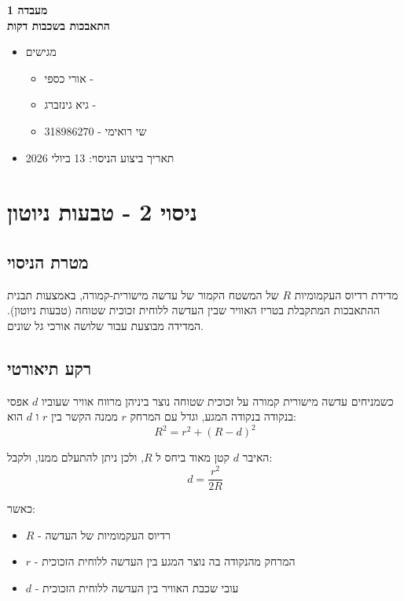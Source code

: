 \documentclass[14pt]{extarticle}
\begin{document}
\begin{center}
    {\LARGE \textbf{מעבדה 1}}\\
    {\textbf{התאבכות בשכבות דקות}}
\end{center}

\begin{itemize}
    \item מגישים
    \begin{itemize}
        \item אורי כספי - 
        \item גיא גינזברג - 
        \item שי רואימי - 318986270
    \end{itemize}
    \item תאריך ביצוע הניסוי: 13 ביולי 2026
\end{itemize}
\newpage
\section*{ניסוי 2 - טבעות ניוטון}

\subsection*{מטרת הניסוי}

מדידת רדיוס העקמומיות $R$ של המשטח הקמור של עדשה מישורית-קמורה,
באמצעות תבנית ההתאבכות המתקבלת בטריז האוויר שבין העדשה ללוחית זכוכית שטוחה (טבעות ניוטון). המדידה מבוצעת עבור שלושה אורכי גל שונים.

\subsection*{רקע תיאורטי}

כשמניחים עדשה מישורית קמורה על זכוכית שטוחה נוצר ביניהן מרווח אוויר שעוביו
$d$
אפסי בנקודה בנקודה המגע, וגדל עם המרחק $r$ ממנה
הקשר בין $r$ ו $d$ הוא:
\begin{equation}
    R^2 = r^2 + (R - d)^2
\end{equation}

האיבר $d$ קטן מאוד ביחס ל $R$, ולכן ניתן להתעלם ממנו, ולקבל:
\begin{equation}
    d = \frac{r^2}{2R}
\end{equation}

כאשר:
\begin{itemize}
    \item $R$ - רדיוס העקמומיות של העדשה
    \item $r$ - המרחק מהנקודה בה נוצר המגע בין העדשה ללוחית הזכוכית
    \item $d$ - עובי שכבת האוויר בין העדשה ללוחית הזכוכית
\end{itemize}
\end{document}

